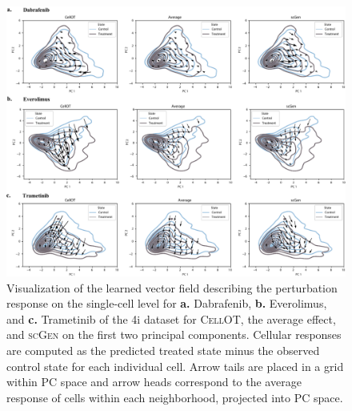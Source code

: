  \begin{figure}
     \centering
     \includegraphics[width=\textwidth]{figures/fig_4i_vector_fields.pdf}
     \caption{Visualization of the learned vector field describing the perturbation response on the single-cell level for \textbf{a.} Dabrafenib, \textbf{b.} Everolimus, and \textbf{c.} Trametinib of the 4i dataset for \textsc{CellOT}, the average effect, and \textsc{scGen} on the first two principal components. Cellular responses are computed as the predicted treated state minus the observed control state for each individual cell. Arrow tails are placed in a grid within PC space and arrow heads correspond to the average response of cells within each neighborhood, projected into PC space.}
     \label{supp_fig:4i_vector_fields}
 \end{figure}

